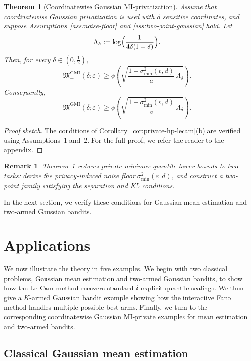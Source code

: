 \documentclass[journal]{IEEEtran}
\newtheorem{theorem}{Theorem}
\newtheorem{remark}{Remark}
\begin{document}
\begin{theorem}[Coordinatewise Gaussian MI-privatization]
\label{thm:gaussian-private-meta}
Assume that coordinatewise Gaussian privatization is used with \(d\) sensitive
coordinates, and suppose Assumptions~\ref{ass:noise-floor} and
\ref{ass:two-point-gaussian} hold. Let
\[
\Lambda_\delta
:=
\log \Bigl(\frac{1}{4\delta(1-\delta)}\Bigr).
\]
Then, for every \(\delta\in(0,\tfrac12)\),
\[
\mathfrak M^{\mathrm{GMI}}_-(\delta;\varepsilon)
\ge
\phi\!\left(
\sqrt{
\frac{1+\sigma_{\min}^2(\varepsilon,d)}{a}\,
\Lambda_\delta
}
\right).
\]
Consequently,
\[
\mathfrak M^{\mathrm{GMI}}(\delta;\varepsilon)
\ge
\phi\!\left(
\sqrt{
\frac{1+\sigma_{\min}^2(\varepsilon,d)}{a}\,
\Lambda_\delta
}
\right).
\]
\end{theorem}
\begin{proof}[Proof sketch]
    The conditions of Corollary~\ref{cor:private-hp-lecam}(b) are verified using
Assumptions~1 and~2. For the full proof, we refer the reader to the appendix.
\end{proof}



\begin{remark}
    Theorem~\ref{thm:gaussian-private-meta} reduces private minimax quantile lower
bounds to two tasks: derive the privacy-induced noise floor
\(\sigma_{\min}^2(\varepsilon,d)\), and construct a two-point family satisfying
the separation and KL conditions.
\end{remark}

In the next section, we verify these
conditions for Gaussian mean estimation and two-armed Gaussian bandits.

\section{Applications}
\label{sec:applications}

We now illustrate the theory in five examples. We begin with two classical
problems, Gaussian mean estimation and two-armed Gaussian bandits, to show how
the Le Cam method recovers standard \(\delta\)-explicit quantile scalings. We
then give a \(K\)-armed Gaussian bandit example showing how the interactive
Fano method handles multiple possible best arms.
Finally, we turn to the corresponding coordinatewise Gaussian MI-private
examples for mean estimation and two-armed bandits.
\subsection{Classical Gaussian mean estimation}
\label{sec:nonprivate-mean}
\end{document}
